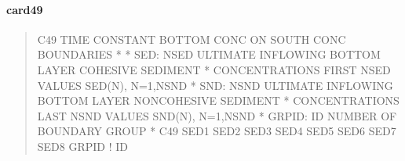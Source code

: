 \documentclass[letterpaper,10pt,english]{sphinxmanual}
\begin{document}
\paragraph{card49}
\label{\detokenize{inputfiles/runcontrol/card49:card49}}\label{\detokenize{inputfiles/runcontrol/card49::doc}}\begin{quote}

\begin{sphinxVerbatim}[commandchars=\\\{\}]
\PYGZhy{}\PYGZhy{}\PYGZhy{}\PYGZhy{}\PYGZhy{}\PYGZhy{}\PYGZhy{}\PYGZhy{}\PYGZhy{}\PYGZhy{}\PYGZhy{}\PYGZhy{}\PYGZhy{}\PYGZhy{}\PYGZhy{}\PYGZhy{}\PYGZhy{}\PYGZhy{}\PYGZhy{}\PYGZhy{}\PYGZhy{}\PYGZhy{}\PYGZhy{}\PYGZhy{}\PYGZhy{}\PYGZhy{}\PYGZhy{}\PYGZhy{}\PYGZhy{}\PYGZhy{}\PYGZhy{}\PYGZhy{}\PYGZhy{}\PYGZhy{}\PYGZhy{}\PYGZhy{}\PYGZhy{}\PYGZhy{}\PYGZhy{}\PYGZhy{}\PYGZhy{}\PYGZhy{}\PYGZhy{}\PYGZhy{}\PYGZhy{}\PYGZhy{}\PYGZhy{}\PYGZhy{}\PYGZhy{}\PYGZhy{}\PYGZhy{}\PYGZhy{}\PYGZhy{}\PYGZhy{}\PYGZhy{}\PYGZhy{}\PYGZhy{}\PYGZhy{}\PYGZhy{}\PYGZhy{}\PYGZhy{}\PYGZhy{}\PYGZhy{}\PYGZhy{}\PYGZhy{}\PYGZhy{}\PYGZhy{}\PYGZhy{}\PYGZhy{}\PYGZhy{}\PYGZhy{}\PYGZhy{}\PYGZhy{}\PYGZhy{}\PYGZhy{}\PYGZhy{}\PYGZhy{}\PYGZhy{}
C49 TIME CONSTANT BOTTOM CONC ON SOUTH CONC BOUNDARIES
*
*    SED: NSED ULTIMATE INFLOWING BOTTOM LAYER COHESIVE SEDIMENT
*         CONCENTRATIONS  FIRST NSED VALUES SED(N), N=1,NSND
*    SND: NSND ULTIMATE INFLOWING BOTTOM LAYER NON\PYGZhy{}COHESIVE SEDIMENT
*         CONCENTRATIONS LAST NSND VALUES SND(N), N=1,NSND
*  GRPID: ID NUMBER OF BOUNDARY GROUP
*
C49      SED1      SED2      SED3      SED4      SED5      SED6      SED7      SED8      GRPID ! ID 
\end{sphinxVerbatim}
\end{quote}
\end{document}
